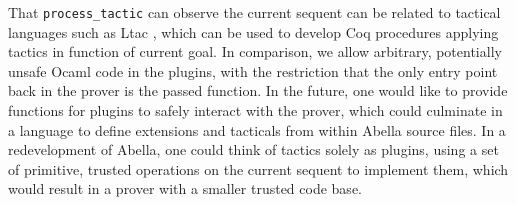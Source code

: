 \documentclass[nocopyrightspace,authoryear]{sigplanconf}
\begin{document}
 That \lstinline|process_tactic| can observe the current sequent can be related to tactical languages such as Ltac \cite{ltacpap}, which can be used to develop Coq procedures applying tactics in function of current goal. In comparison, we allow arbitrary, potentially unsafe Ocaml code in the plugins, with the restriction that the only entry point back in the prover is the passed function. In the future, one would like to provide functions for plugins to safely interact with the prover, which could culminate in a language to define extensions and tacticals from within Abella source files. In a redevelopment of Abella, one could think of tactics solely as plugins, using a set of primitive, trusted operations on the current sequent to implement them, which would result in a prover with a smaller trusted code base.




 

 
\end{document}
